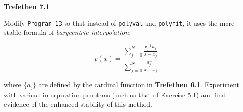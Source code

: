 \textbf{Trefethen 7.1}

Modify \texttt{Program 13} so that instead of \texttt{polyval} and \texttt{polyfit}, it uses the more stable formula of 
\textit{barycentric interpolation}:

$$
  p(x) = \frac{ \sum_{j=0}^N \frac{a_j^{-1} u_j}{x - x_j} }{ \sum_{j=0}^N \frac{a_j^{-1}}{x - x_j} }
$$

where $\{a_j\}$ are defined by the cardinal function in \textbf{Trefethen 6.1}. Experiment with various interpolation
problems (such as that of Exercise 5.1) and find evidence of the enhanced stability of this method.

\begin{solution}
  \ \\
  \vfill
\end{solution}